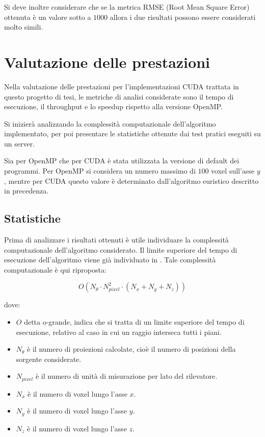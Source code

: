 \documentclass[12pt,a4paper]{report}
\begin{document}
Si deve inoltre considerare che se la metrica RMSE (Root Mean Square Error) ottenuta è un valore sotto a \(1000\) allora i due
risultati possono essere considerati molto simili.

\chapter{Valutazione delle prestazioni}

Nella valutazione delle prestazioni per l'implementazioni CUDA trattata in questo progetto di tesi, le metriche di analisi
considerate sono il tempo di esecuzione, il throughput e lo speedup rispetto alla versione OpenMP.

Si inizierà analizzando la complessità computazionale dell'algoritmo implementato, per poi presentare le statistiche ottenute dai
test pratici eseguiti su un server.

Sia per OpenMP che per CUDA è stata utilizzata la versione di default dei programmi.
Per OpenMP si considera un numero massimo di \(100\) voxel sull'asse \(y\), mentre per CUDA questo valore è determinato
dall'algoritmo euristico descritto in precedenza.

\section{Statistiche}

Prima di analizzare i risultati ottenuti è utile individuare la complessità computazionale dell'algoritmo considerato.
Il limite superiore del tempo di esecuzione dell'algoritmo viene già individuato in \cite{Colletta2024}.
Tale complessità computazionale è qui riproposta:

\begin{equation} \label{eq:computational_complexity}
  O(N_\theta \cdot N_{pixel}^2 \cdot (N_x + N_y + N_z))
\end{equation}

dove:
\begin{itemize}
  \item \(O\) detta o-grande, indica che si tratta di un limite superiore del tempo di esecuzione, relativo al caso in cui un
        raggio interseca tutti i piani.
  \item \(N_\theta\) è il numero di proiezioni calcolate, cioè il numero di posizioni della sorgente considerate.
  \item \(N_{pixel}\) è il numero di unità di misurazione per lato del rilevatore.
  \item \(N_x\) è il numero di voxel lungo l'asse \(x\).
  \item \(N_y\) è il numero di voxel lungo l'asse \(y\).
  \item \(N_z\) è il numero di voxel lungo l'asse \(z\).
\end{itemize}
\end{document}
